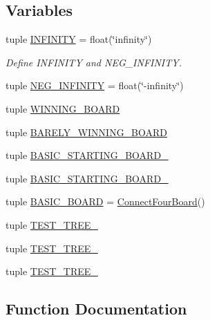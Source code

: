 \subsection*{Variables}
\begin{DoxyCompactItemize}
\item 
tuple \hyperlink{namespaceutil_a7eb14c55451b00b740e7a1f68099e86d}{I\+N\+F\+I\+N\+I\+T\+Y} = float(\char`\"{}infinity\char`\"{})
\begin{DoxyCompactList}\small\item\em Define \textquotesingle{}I\+N\+F\+I\+N\+I\+T\+Y\textquotesingle{} and \textquotesingle{}N\+E\+G\+\_\+\+I\+N\+F\+I\+N\+I\+T\+Y\textquotesingle{}. \end{DoxyCompactList}\item 
tuple \hyperlink{namespaceutil_af395e63ea20fc9bb8466417c67280fc4}{N\+E\+G\+\_\+\+I\+N\+F\+I\+N\+I\+T\+Y} = float(\char`\"{}-\/infinity\char`\"{})
\item 
tuple \hyperlink{namespaceutil_ad0bc1a0f6b9b7b0f55adf4b9120ba14d}{W\+I\+N\+N\+I\+N\+G\+\_\+\+B\+O\+A\+R\+D}
\item 
tuple \hyperlink{namespaceutil_a9b1bc05e3033e4dcb536327cd0fd4b41}{B\+A\+R\+E\+L\+Y\+\_\+\+W\+I\+N\+N\+I\+N\+G\+\_\+\+B\+O\+A\+R\+D}
\item 
tuple \hyperlink{namespaceutil_aecf4927bd0b242a8302cb1c60cc19af5}{B\+A\+S\+I\+C\+\_\+\+S\+T\+A\+R\+T\+I\+N\+G\+\_\+\+B\+O\+A\+R\+D\+\_}
\item 
tuple \hyperlink{namespaceutil_a70ced14d7bb5c7b954153b6b13c45781}{B\+A\+S\+I\+C\+\_\+\+S\+T\+A\+R\+T\+I\+N\+G\+\_\+\+B\+O\+A\+R\+D\+\_}
\item 
tuple \hyperlink{namespaceutil_a10b9210601911f13607868bf248c4f6c}{B\+A\+S\+I\+C\+\_\+\+B\+O\+A\+R\+D} = \hyperlink{classconnectfour_1_1_connect_four_board}{Connect\+Four\+Board}()
\item 
tuple \hyperlink{namespaceutil_aeb1172b7a9311e22f027d739b689c080}{T\+E\+S\+T\+\_\+\+T\+R\+E\+E\+\_}
\item 
tuple \hyperlink{namespaceutil_a9ae6aec6e35dfd821e0ffaac044a1990}{T\+E\+S\+T\+\_\+\+T\+R\+E\+E\+\_}
\item 
tuple \hyperlink{namespaceutil_a66be78f83e41a72ba109897c87dd8c37}{T\+E\+S\+T\+\_\+\+T\+R\+E\+E\+\_}
\end{DoxyCompactItemize}


\subsection{Function Documentation}
\hypertarget{namespaceutil_ab8b35c47eb1a77e7a3f61851a1b46122}{}
